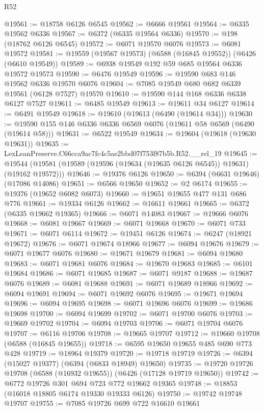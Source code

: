 \begin{lexlean}{R52}
\begin{coremodule}
@19561 := @18758 @6126 @6545
@19562 := @6666 @19561
@19564 := @6335 @19562 @6336
@19567 := @6372 (@6335 @19564 @6336)
@19570 := @198 (@18762 @6126 @6545)
@19572 := @6071 @19570 @6076
@19573 := @6081 @19572
@19581 := @19559 (@19567 @19573) (@6588 (@16845 @19552)) (@6426 (@6610 @19549))
@19589 := @6938 @19549 @192 @59 @685 @19564 @6336 @19572 @19573
@19590 := @6476 @19549
@19596 := @19590 @683 @146 @19562 @6336 @19570 @6076
@19604 := @7085 @19549 @680 @682 @6339 @19561 (@6128 @7527) @19570
@19610 := @19590 @144 @168 @6336 @6338 @6127 @7527
@19611 := @6485 @19549
@19613 := @19611 @34 @6127
@19614 := @6491 @19549
@19618 := @19610 (@19613 (@6490 (@19614 @34)))
@19630 := @19590 @155 @146 @6336 @6336 @6569 @6076 (@19611 @58 @6569 (@6490 (@19614 @58)))
@19631 := @6522 @19549
@19634 := @19604 (@19618 (@19630 @19631))
@19635 := LexLeanPreserve.C66cca9ac7fc4c5ae2bbd07f753f87b5b.R52.__rel_19
@19645 := @19544 (@19581 (@19589 (@19596 (@19634 (@19635 @6126 @6545)) @19631) (@19162 @19572)))
@19646 := @19376 @6126
@19650 := @6394 (@6631 @19646) (@17086 @14086)
@19651 := @6566 @19650
@19652 := @2 @6174
@19655 := @19376 (@19652 @6082 @6073)
@19660 := @19651 @19655 @477 @131 @686 @776
@19661 := @19334 @6126
@19662 := @16611 @19661
@19665 := @6372 (@6335 @19662 @19365)
@19666 := @6071 @14083
@19667 := @19666 @6076
@19668 := @6081 @19667
@19669 := @6071 @19668
@19670 := @6071 @733
@19671 := @6071 @6114
@19672 := @19451 @6126
@19674 := @6247 (@18921 @19672)
@19676 := @6071 @19674 @18966
@19677 := @6094 @19676
@19679 := @6071 @19677 @6076
@19680 := @19671 @19679
@19681 := @6094 @19680
@19683 := @6071 @19681 @6076
@19684 := @19670 @19683
@19685 := @6101 @19684
@19686 := @6071 @19685
@19687 := @6071 @9187
@19688 := @19687 @6076
@19689 := @6081 @19688
@19691 := @6071 @19689 @18966
@19692 := @6094 @19691
@19694 := @6071 @19692 @6076
@19695 := @19671 @19694
@19696 := @6094 @19695
@19698 := @6071 @19696 @6076
@19699 := @19686 @19698
@19700 := @6094 @19699
@19702 := @6071 @19700 @6076
@19703 := @19669 @19702
@19704 := @6094 @19703
@19706 := @6071 @19704 @6076
@19707 := @6116 @19706
@19708 := @19665 @19707
@19712 := @19660 @19708 (@6588 (@16845 @19655))
@19718 := @6595 @19650 @19655 @485 @690 @773 @428
@19719 := @18964 @19379
@19720 := @19718 @19719
@19726 := @6394 (@15027 @19377) (@6394 (@6833 @18949) @19650)
@19735 := @19720 @19726 @19708 (@6588 (@16932 @19655)) (@6426 (@17128 @19719 @19650))
@19742 := @6772 @19726 @301 @694 @723 @772 @19662 @19365
@19748 := @18853 (@16018 @18805 @6174 @19330 @19333 @6126)
@19750 := @19742 @19748 @19707
@19755 := @7085 @19726 @699 @722 @16610 @19661

\end{coremodule}
\end{lexlean}
